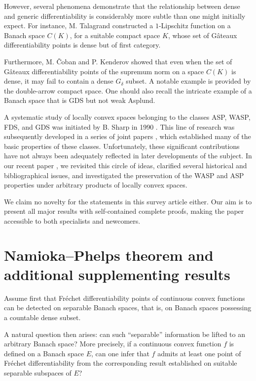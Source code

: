 \documentclass[12pt]{amsart}
\theoremstyle{plain}
\theoremstyle{definition}
\theoremstyle{remark}
\begin{document}
However, several phenomena demonstrate that the relationship between dense and generic differentiability is considerably more subtle than one might initially expect. For instance, M. Talagrand \cite{Tal1} constructed a $1$-Lipschitz function on a Banach space $C(K)$, for a suitable compact space $K$, whose set of G\^ateaux differentiability points is dense but of first category.

Furthermore, M. \v{C}oban and P. Kenderov \cite{Coban} showed that even when the set of G\^ateaux differentiability points of the supremum norm on a space $C(K)$ is dense, it may fail to contain a dense $G_\delta$ subset. A notable example is provided by the double-arrow compact space. One should also recall the intricate example \cite{Moors} of a Banach space that is GDS but not weak Asplund.

A systematic study of locally convex spaces belonging to the classes ASP, WASP, FDS, and GDS was initiated by B. Sharp in 1990 \cite{s}. This line of research was subsequently developed in a series of joint papers \cite{es, Eyland_Sharp2, Eyland_Sharp3}, which established many of the basic properties of these classes. Unfortunately, these significant contributions have not always been adequately reflected in later developments of the subject. In our recent paper \cite{KL3}, we revisited this circle of ideas, clarified several historical and bibliographical issues, and investigated the preservation of the WASP and ASP properties under arbitrary products of locally convex spaces.

We claim no novelty for the statements in this survey article either.
Our aim is to present all major results with self-contained complete proofs, making the paper accessible to both specialists and newcomers.

\section{Namioka--Phelps theorem and additional supplementing results}

Assume first that Fr\'echet differentiability points of continuous convex functions can be detected on separable Banach spaces, that is, on Banach spaces possessing a countable dense subset.

A natural question then arises: can such ``separable'' information be lifted to an arbitrary Banach space? More precisely, if a continuous convex function $f$ is defined on a Banach space $E$, can one infer that $f$ admits at least one point of Fr\'echet differentiability from the corresponding result established on suitable separable subspaces of $E$?
\end{document}
